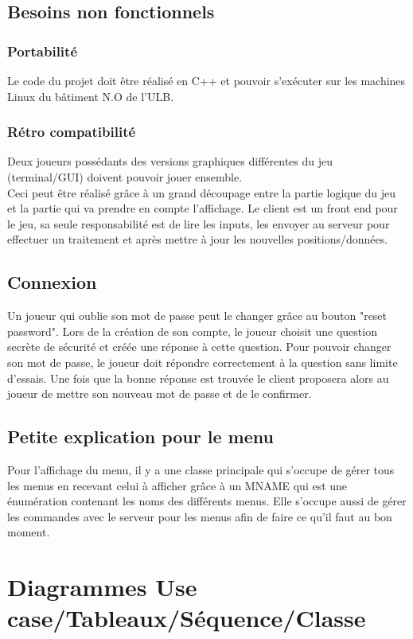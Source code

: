 \documentclass[french]{article}
\begin{document}
\subsection{Besoins non fonctionnels} 
\subsubsection{Portabilité} Le code du projet doit être réalisé en C++ et pouvoir s'exécuter sur les machines Linux du bâtiment N.O de l'ULB. 
\subsubsection{Rétro compatibilité} Deux joueurs possédants des versions graphiques différentes du jeu (terminal/GUI) doivent pouvoir jouer ensemble.\\
Ceci peut être réalisé grâce à un grand découpage entre la partie logique du jeu et la partie qui va prendre en compte l'affichage. Le client est un front end pour le jeu, sa seule responsabilité est de lire les inputs, les envoyer au serveur pour effectuer un traitement et après mettre à jour les nouvelles positions/données.
\subsection{Connexion}
Un joueur qui oublie son mot de passe peut le changer grâce au bouton "reset password".
Lors de la création de son compte, le joueur choisit une question secrète de sécurité et créée une réponse à cette question. Pour pouvoir changer son mot de passe, le joueur doit répondre correctement à la question sans limite d'essais.
Une fois que la bonne réponse est trouvée le client proposera alors au joueur de mettre son nouveau mot de passe et de le confirmer.
\subsection{Petite explication pour le menu}
Pour l'affichage du menu, il y a une classe principale qui s'occupe de gérer tous les menus en recevant celui à afficher grâce à un MNAME qui est une énumération contenant les noms des différents menus. Elle s'occupe aussi de gérer les commandes avec le serveur pour les menus afin de faire ce qu'il faut au bon moment.
\newpage 
\section{Diagrammes Use case/Tableaux/Séquence/Classe}
\renewcommand{\arraystretch}{1.5}
\end{document}
